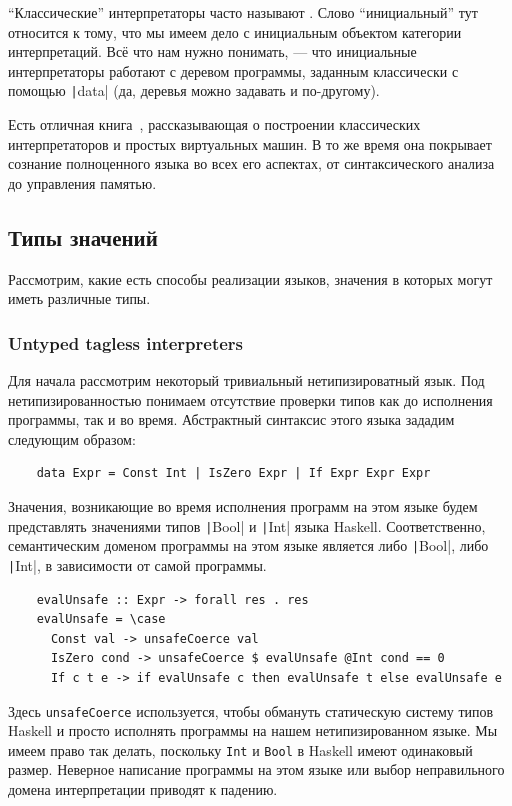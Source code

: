 ``Классические'' интерпретаторы часто называют .
Слово ``инициальный'' тут относится к тому, что мы имеем дело с инициальным объектом категории интерпретаций.
Всё что нам нужно понимать, --- что инициальные интерпретаторы работают с деревом программы, заданным классически с помощью \texttt|data| (да, деревья можно задавать и по-другому).

Есть отличная книга~\cite{nystrom2021crafting}, рассказывающая о построении классических интерпретаторов и простых виртуальных машин.
В то же время она покрывает сознание полноценного языка во всех его аспектах, от синтаксического анализа до управления памятью.

\subsection{Типы значений}

Рассмотрим, какие есть способы реализации языков, значения в которых могут иметь различные типы.

\subsubsection{Untyped tagless interpreters}

Для начала рассмотрим некоторый тривиальный нетипизироватный язык.
Под нетипизированностью понимаем отсутствие проверки типов как до исполнения программы, так и во время.
Абстрактный синтаксис этого языка зададим следующим образом:
\begin{verbatim}
    data Expr = Const Int | IsZero Expr | If Expr Expr Expr
\end{verbatim}

Значения, возникающие во время исполнения программ на этом языке будем представлять значениями типов \texttt|Bool| и \texttt|Int| языка Haskell.
Соответственно, семантическим доменом программы на этом языке является либо \texttt|Bool|, либо \texttt|Int|, в зависимости от самой программы.
\begin{verbatim}
    evalUnsafe :: Expr -> forall res . res
    evalUnsafe = \case
      Const val -> unsafeCoerce val
      IsZero cond -> unsafeCoerce $ evalUnsafe @Int cond == 0
      If c t e -> if evalUnsafe c then evalUnsafe t else evalUnsafe e
\end{verbatim}

Здесь \texttt{unsafeCoerce} используется, чтобы обмануть статическую систему типов Haskell и просто исполнять программы на нашем нетипизированном языке.
Мы имеем право так делать, поскольку \texttt{Int} и \texttt{Bool} в Haskell имеют одинаковый размер.
Неверное написание программы на этом языке или выбор неправильного домена интерпретации приводят к падению.

